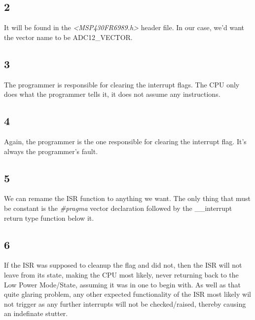 \documentclass{article}
\begin{document}
\subsection{2}
It will be found in the \textit{<MSP430FR6989.h>} header file. In our case, we'd want the vector name to be ADC12\_VECTOR.

\subsection{3}
The programmer is responsible for clearing the interrupt flags. The CPU only does what the programmer tells it, it does not assume any instructions.

\subsection{4}
Again, the programmer is the one responsible for clearing the interrupt flag. It's always the programmer's fault.

\subsection{5}
We can remame the ISR function to anything we want. The only thing that must be constant is the \textit{\#pragma} vector declaration followed by the \_\_interrupt return type function below it.

\subsection{6}
If the ISR was supposed to cleanup the flag and did not, then the ISR will not leave from its state, making the CPU most likely, never returning back to the Low Power Mode/State, assuming it was in one to begin with. As well as that quite glaring problem, any other expected functionality of the ISR most likely wil not trigger as any further interrupts will not be checked/raised, thereby causing an indefinate stutter.
\end{document}
